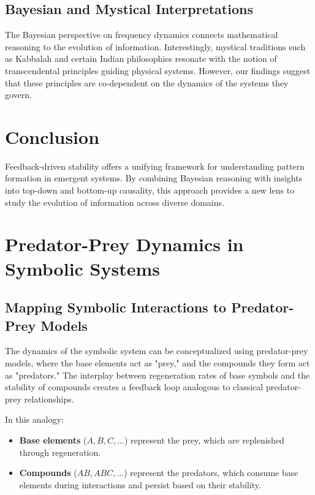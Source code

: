\documentclass[entropy,article,submit,pdftex,moreauthors]{Definitions/mdpi}
\begin{document}
\subsection{Bayesian and Mystical Interpretations}

The Bayesian perspective on frequency dynamics connects mathematical reasoning to the evolution of information. Interestingly, mystical traditions such as Kabbalah and certain Indian philosophies resonate with the notion of transcendental principles guiding physical systems. However, our findings suggest that these principles are co-dependent on the dynamics of the systems they govern.

\section{Conclusion}

Feedback-driven stability offers a unifying framework for understanding pattern formation in emergent systems. By combining Bayesian reasoning with insights into top-down and bottom-up causality, this approach provides a new lens to study the evolution of information across diverse domains.

\section{Predator-Prey Dynamics in Symbolic Systems}

\subsection{Mapping Symbolic Interactions to Predator-Prey Models}

The dynamics of the symbolic system can be conceptualized using predator-prey models, where the base elements act as "prey," and the compounds they form act as "predators." The interplay between regeneration rates of base symbols and the stability of compounds creates a feedback loop analogous to classical predator-prey relationships.

In this analogy:
\begin{itemize}
    \item \textbf{Base elements} (\( A, B, C, \ldots \)) represent the prey, which are replenished through regeneration.
    \item \textbf{Compounds} (\( AB, ABC, \ldots \)) represent the predators, which consume base elements during interactions and persist based on their stability.
\end{itemize}
\end{document}
